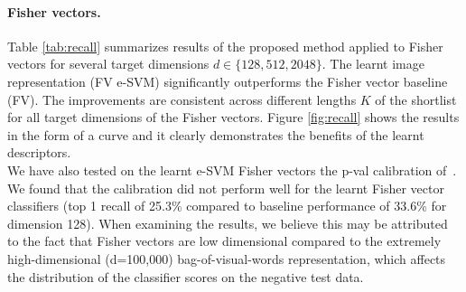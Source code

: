 \documentclass[10pt,twocolumn,letterpaper]{article}
\begin{document}
      \paragraph{Fisher vectors.}
         \begin{table}[b]
            \begin{centering}
               
               \caption{ \textbf{Results on Pittsburgh 25k dataset - Fisher vectors.}
                  The fraction of correctly recognized queries (recall@K)
                     in the top $K\in\{1,2,5,10,20\}$ retrieved images.
                     The learnt descriptors by the proposed method (FV e-SVM) consistently improve over the raw Fisher vector descriptors (FV) across the whole range of $K$  and all dimensions.
            }
            \label{tab:recall}
            \end{centering}
         \end{table}
         Table \ref{tab:recall} summarizes results of the proposed method applied to Fisher vectors for several target dimensions $d\in\{128,512,2048\}$. The learnt image representation (FV e-SVM) significantly outperforms the Fisher vector baseline (FV). The improvements are consistent across different lengths $K$ of the shortlist for all target dimensions of the Fisher vectors.
         Figure \ref{fig:recall} shows the results in the form of a curve and it clearly demonstrates the benefits of the learnt descriptors. 
         \\
         We have also tested on the learnt e-SVM Fisher vectors the p-val calibration of~\cite{Gronat13}. We found that the calibration did not perform well for the learnt Fisher vector classifiers (top 1 recall of 25.3\% compared to baseline performance of 33.6\% for dimension 128). When examining the results, we believe this may be attributed to the fact that Fisher vectors are low dimensional compared to the extremely high-dimensional (d=100,000) bag-of-visual-words representation, which affects the distribution of the classifier scores on the negative test data.
\end{document}
